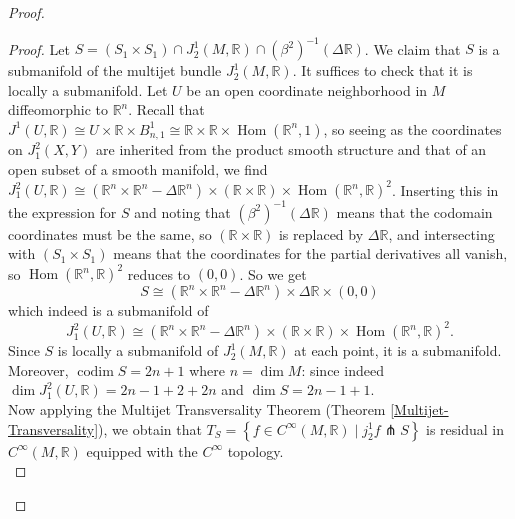 \documentclass[reqno]{amsart}
\theoremstyle{definition}
\theoremstyle{remark}
\DeclareMathOperator{\Hom}{Hom}
\DeclareMathOperator{\codim}{codim}
\begin{document}
\begin{proof}
 \begin{proof}
     Let
     $S = \left( S_1 \times S_1 \right) \cap
     J_2^{1}(M,\mathbb{R}) \cap
     \left( \beta^2 \right)^{-1}
     \left( \Delta \mathbb{R} \right) $.
     We claim that $S$ is a submanifold of the
     multijet bundle
     $J_2^{1}(M,\mathbb{R})$.
     It suffices to check that it is locally
     a submanifold.
     Let $U$ be an open coordinate
     neighborhood in $M$ diffeomorphic to
     $\mathbb{R}^{n}$. Recall that
     $J^{1}(U,\mathbb{R}) \cong
     U \times \mathbb{R} \times B_{n,1}^{1}
     \cong \mathbb{R} \times \mathbb{R} \times 
     \Hom \left( \mathbb{R}^{n},1 \right) $, so
     seeing as the coordinates on
     $J_1^2 (X,Y)$ are inherited from the product smooth
     structure and that of an open subset of a smooth
     manifold, we find
     $J_1^2(U, \mathbb{R}) \cong
     \left( \mathbb{R}^{n} \times \mathbb{R}^{n}
     - \Delta\mathbb{R}^{n} \right) \times 
     \left( \mathbb{R} \times \mathbb{R} \right) 
     \times \Hom\left(\mathbb{R}^{n},\mathbb{R}  \right)^2 $.
     Inserting this in the expression for
     $S$ and noting that
     $\left( \beta^2 \right)^{-1}
     \left( \Delta \mathbb{R} \right) $ means
     that the codomain coordinates must be the same,
     so $\left( \mathbb{R} \times \mathbb{R} \right) $ is
     replaced by $\Delta \mathbb{R}$, and
     intersecting with $\left( S_1 \times S_1 \right) $ means
     that the coordinates for the
     partial derivatives all vanish, so
     $\Hom \left( \mathbb{R}^{n},\mathbb{R} \right)^2$ reduces
     to $\left( 0,0 \right) $. So we get
     \[
     S \cong \left( \mathbb{R}^{n} \times \mathbb{R}^{n}
     - \Delta \mathbb{R}^{n} \right) \times 
     \Delta \mathbb{R} \times \left( 0,0 \right) 
     \] 
     which indeed is a submanifold of
     \[
         J_1^2 \left( U, \mathbb{R} \right) 
         \cong 
         \left( \mathbb{R}^{n} \times \mathbb{R}^{n}
         - \Delta \mathbb{R}^{n} \right) \times 
         \left( \mathbb{R} \times \mathbb{R} \right) 
         \times \Hom \left( \mathbb{R}^{n},\mathbb{R} \right)^2.
     \] 
     Since $S$ is locally a submanifold of
     $J_2^{1}(M,\mathbb{R})$ at each point, it is a submanifold.
     Moreover, 
     $\codim S = 2n+1$ where $n = \dim M$: since indeed
     $\dim J_1^2 \left( U,\mathbb{R} \right) 
     = 2n - 1 + 2 + 2n$ and
     $\dim S = 2n-1 + 1$.\\
     Now applying the Multijet Transversality Theorem
 (Theorem \ref{Multijet-Transversality}), we obtain that
  $T_{S} = 
  \left\{ f \in C^{\infty}(M, \mathbb{R}) \mid 
  j_2^{1} f \pitchfork S \right\} $ is
  residual in
  $C^{\infty}(M, \mathbb{R})$ equipped with the
  $C^{\infty}$ topology.\\



\end{proof}
\end{proof}
\end{document}
